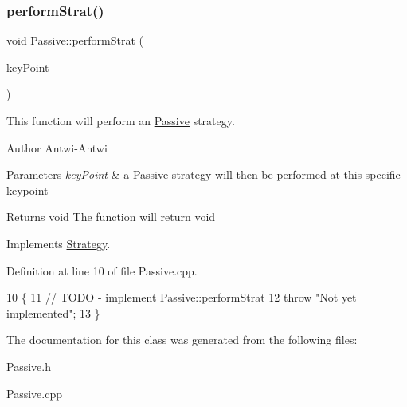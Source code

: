 \subsubsection{\texorpdfstring{perform\+Strat()}{performStrat()}}
{\footnotesize\ttfamily void Passive\+::perform\+Strat (\begin{DoxyParamCaption}\item[{\hyperlink{classKeyPoint}{Key\+Point} $\ast$}]{key\+Point }\end{DoxyParamCaption})\hspace{0.3cm}{\ttfamily [virtual]}}



This function will perform an \hyperlink{classPassive}{Passive} strategy. 

\begin{DoxyAuthor}{Author}
Antwi-\/\+Antwi
\end{DoxyAuthor}

\begin{DoxyParams}{Parameters}
{\em key\+Point} & a \hyperlink{classPassive}{Passive} strategy will then be performed at this specific keypoint\\
\hline
\end{DoxyParams}
\begin{DoxyReturn}{Returns}
void The function will return void 
\end{DoxyReturn}


Implements \hyperlink{classStrategy_ada170bd47bc6f11ac02d7df2b366387b}{Strategy}.



Definition at line 10 of file Passive.\+cpp.


\begin{DoxyCode}
10                                              \{
11     \textcolor{comment}{// TODO - implement Passive::performStrat}
12     \textcolor{keywordflow}{throw} \textcolor{stringliteral}{"Not yet implemented"};
13 \}
\end{DoxyCode}


The documentation for this class was generated from the following files\+:\begin{DoxyCompactItemize}
\item 
Passive.\+h\item 
Passive.\+cpp\end{DoxyCompactItemize}
